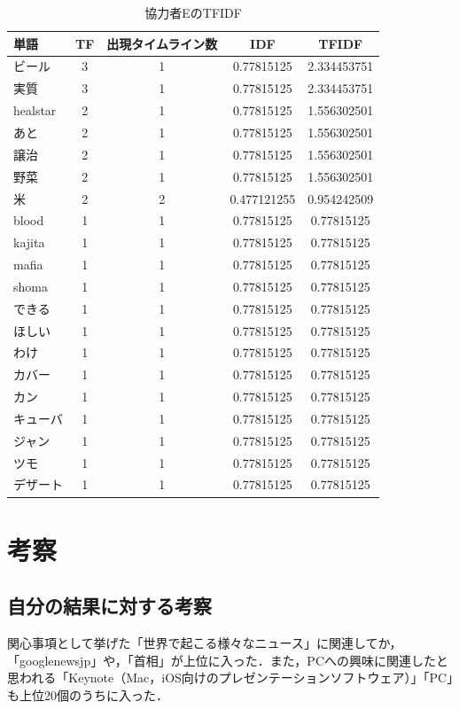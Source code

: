 \begin{table}[H]
	\centering
	\caption{協力者EのTFIDF}
	\begin{tabular}{l|c|c|c|c}
		単語 & TF & 出現タイムライン数 & IDF & TFIDF \\ \hline
		ビール & 3 & 1 & 0.77815125 & 2.334453751 \\
		実質 & 3 & 1 & 0.77815125 & 2.334453751 \\
		healstar & 2 & 1 & 0.77815125 & 1.556302501 \\
		あと & 2 & 1 & 0.77815125 & 1.556302501 \\
		譲治 & 2 & 1 & 0.77815125 & 1.556302501 \\
		野菜 & 2 & 1 & 0.77815125 & 1.556302501 \\
		米 & 2 & 2 & 0.477121255 & 0.954242509 \\
		blood & 1 & 1 & 0.77815125 & 0.77815125 \\
		kajita & 1 & 1 & 0.77815125 & 0.77815125 \\
		mafia & 1 & 1 & 0.77815125 & 0.77815125 \\
		shoma & 1 & 1 & 0.77815125 & 0.77815125 \\
		できる & 1 & 1 & 0.77815125 & 0.77815125 \\
		ほしい & 1 & 1 & 0.77815125 & 0.77815125 \\
		わけ & 1 & 1 & 0.77815125 & 0.77815125 \\
		カバー & 1 & 1 & 0.77815125 & 0.77815125 \\
		カン & 1 & 1 & 0.77815125 & 0.77815125 \\
		キューバ & 1 & 1 & 0.77815125 & 0.77815125 \\
		ジャン & 1 & 1 & 0.77815125 & 0.77815125 \\
		ツモ & 1 & 1 & 0.77815125 & 0.77815125 \\
		デザート & 1 & 1 & 0.77815125 & 0.77815125
	\end{tabular}
\end{table}

\chapter{考察}

\section{自分の結果に対する考察}
関心事項として挙げた「世界で起こる様々なニュース」に関連してか，「googlenewsjp」や，「首相」が上位に入った．また，PCへの興味に関連したと思われる「Keynote（Mac，iOS向けのプレゼンテーションソフトウェア）」「PC」も上位20個のうちに入った．

